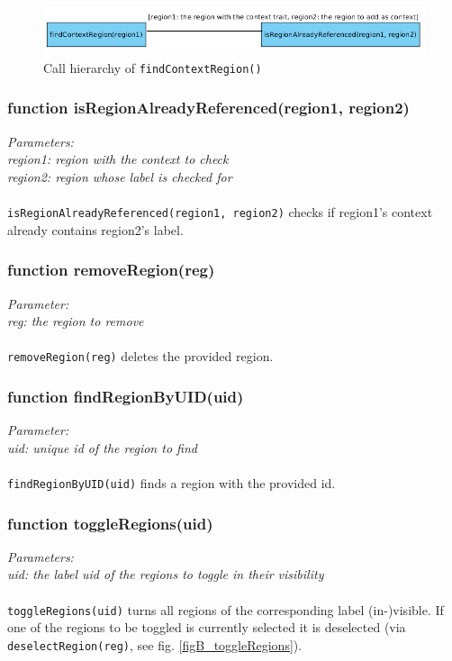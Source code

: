 \begin{figure}[H]
	\begin{center}
		\includegraphics[scale=0.4]{img/ch_findContext.png}
		\caption{Call hierarchy of \texttt{findContextRegion()}}
		\label{figB_findContext}
	\end{center}
\end{figure}


\subsubsection{function isRegionAlreadyReferenced(region1, region2)}
\emph{Parameters:\\
	region1: region with the context to check\\
	region2: region whose label is checked for\\ \\
}
\texttt{isRegionAlreadyReferenced(region1, region2)} checks if region1's context already contains region2’s label.


\subsubsection{function removeRegion(reg)}
\emph{Parameter:\\
	reg: the region to remove\\ \\
}
\texttt{removeRegion(reg)} deletes the provided region.


\subsubsection{function findRegionByUID(uid)}
\emph{Parameter:\\
	uid: unique id of the region to find\\ \\
}
\texttt{findRegionByUID(uid)} finds a region with the provided id.


\subsubsection{function toggleRegions(uid)}
\emph{Parameters:\\
	uid: the label uid of the regions to toggle in their visibility\\ \\
}
\texttt{toggleRegions(uid)} turns all regions of the corresponding label (in-)visible. If one of the regions to be toggled is currently selected it is deselected (via \texttt{deselectRegion(reg)}, see fig. \ref{figB_toggleRegions}).

